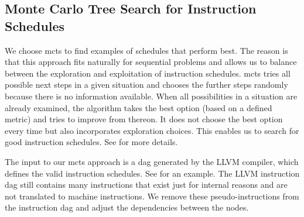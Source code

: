 \subsection{Monte Carlo Tree Search for Instruction Schedules}
\label{subsec:approach:ml:mcts}
We choose \ac{mcts} to find examples of schedules that perform best.
The reason is that this approach fits naturally for sequential problems and allows us to balance between the exploration and exploitation of instruction schedules. 
\ac{mcts} tries all possible next steps in a given situation and chooses the further steps randomly because there is no information available.
When all possibilities in a situation are already examined, the algorithm takes the best option (based on a defined metric) and tries to improve from thereon.
It does not choose the best option every time but also incorporates exploration choices.
This enables us to search for good instruction schedules.
See  for more details.

The input to our \ac{mcts} approach is a \ac{dag} generated by the LLVM compiler, which defines the valid instruction schedules.
See  for an example.
The LLVM instruction \ac{dag} still contains many instructions that exist just for internal reasons and are not translated to machine instructions.
We remove these pseudo-instructions from the instruction \ac{dag} and adjust the dependencies between the nodes.

